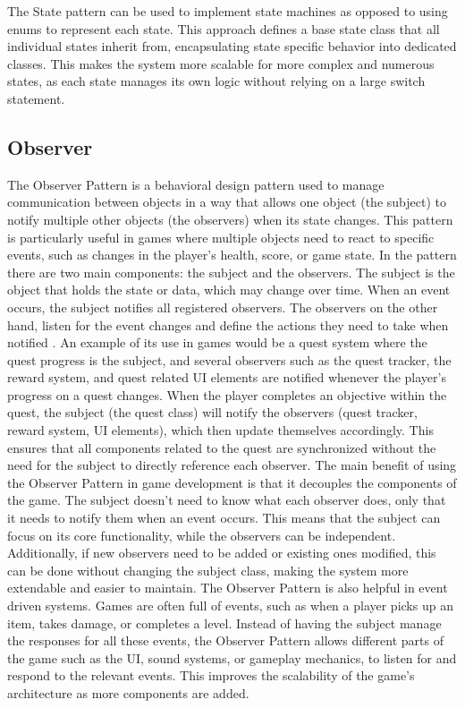 \documentclass[]{final_report}
\begin{document}
\newline
The State pattern can be used to implement state machines as opposed to using enums to represent each state. This approach defines a base state class that all individual states inherit from, encapsulating state specific behavior into dedicated classes. This makes the system more scalable for more complex and numerous states, as each state manages its own logic without relying on a large switch statement. 
\color{black} 


\subsection{Observer}\label{observer}
\color{red}
The Observer Pattern is a behavioral design pattern used to manage communication between objects in a way that allows one object (the subject) to notify multiple other objects (the observers) when its state changes. This pattern is particularly useful in games where multiple objects need to react to specific events, such as changes in the player’s health, score, or game state. In the pattern there are two main components: the subject and the observers. The subject is the object that holds the state or data, which may change over time. When an event occurs, the subject notifies all registered observers. The observers on the other hand, listen for the event changes and define the actions they need to take when notified \cite{nystrom2011game}.
\newline
An example of its use in games would be a quest system where the quest progress is the subject, and several observers such as the quest tracker, the reward system, and quest related UI elements are notified whenever the player's progress on a quest changes. When the player completes an objective within the quest, the subject (the quest class) will notify the observers (quest tracker, reward system, UI elements), which then update themselves accordingly. This ensures that all components related to the quest are synchronized without the need for the subject to directly reference each observer.
\newline
The main benefit of using the Observer Pattern in game development is that it decouples the components of the game. The subject doesn’t need to know what each observer does, only that it needs to notify them when an event occurs. This means that the subject can focus on its core functionality, while the observers can be independent. Additionally, if new observers need to be added or existing ones modified, this can be done without changing the subject class, making the system more extendable and easier to maintain.
\newline
The Observer Pattern is also helpful in event driven systems. Games are often full of events, such as when a player picks up an item, takes damage, or completes a level. Instead of having the subject manage the responses for all these events, the Observer Pattern allows different parts of the game such as the UI, sound systems, or gameplay mechanics, to listen for and respond to the relevant events. This improves the scalability of the game’s architecture as more components are added.
\color{black}
\end{document}
